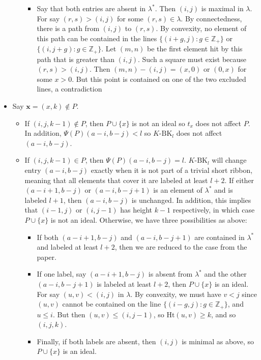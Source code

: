 \documentclass[10pt,letter]{article}
\begin{document}
\begin{itemize}
\begin{itemize}
\begin{itemize}
\item Say that both entries are absent in $\lambda^{\ast}$. Then $(i,j)$ is maximal in $\lambda$. For say $(r,s) > (i,j)$ for some $(r,s) \in \lambda$. By connectedness, there is a path from $(i,j)$ to $(r,s)$. By convexity, no element of this path can be contained in the lines $\lbrace (i+g,j): g \in \mathbb{Z}_+ \rbrace$ or  $\lbrace (i,j+g): g \in \mathbb{Z}_+ \rbrace$. Let $(m,n)$ be the first element hit by this path that is greater than $(i,j)$. Such a square must exist because $(r,s) > (i,j)$. Then $(m,n) - (i,j) = (x,0)$ or $(0,x)$ for some $x > 0$. But this point is contained on one of the two excluded lines, a contradiction
\end{itemize}

\end{itemize}

\item Say $\textbf{x} = (x,k) \not \in P$. 
\begin{itemize}
\item If $(i,j,k-1) \not \in P$, then $P \cup \lbrace x \rbrace$ is not an ideal so $t_x$ does not affect $P$. In addition, $\Psi(P)(a-i,b-j) < l$ so $K$-$\text{BK}_l$ does not affect $(a-i,b-j)$.
\item If $(i,j,k-1) \in P$, then $\Psi(P)(a-i,b-j) = l$. $K$-$\text{BK}_l$ will change entry $(a-i,b-j)$ exactly when it is not part of a trivial short ribbon, meaning that all elements that cover it are labeled at least $l + 2$. If either $(a-i+1,b-j)$ or $(a-i,b-j+1)$ is an element of $\lambda^{\ast}$ and is labeled $l+1$, then $(a-i,b-j)$ is unchanged. In addition, this implies that $(i-1,j)$ or $(i,j-1)$ has height $k-1$ respectively, in which case $P \cup \lbrace x \rbrace$ is not an ideal. Otherwise, we have three possibilities as above:
\begin{itemize}
\item If both $(a-i+1,b-j)$ and $(a-i,b-j+1)$ are contained in $\lambda^{\ast}$ and labeled at least $l+2$, then we are reduced to the case from the paper.
\item If one label, say $(a-i+1,b-j)$ is absent from $\lambda^{\ast}$ and the other $(a-i,b-j+1)$ is labeled at least $l+2$, then $P \cup \lbrace x \rbrace$ is an ideal. For say $(u,v) < (i,j)$ in $\lambda$. By convexity, we must have $v < j$ since $(u,v)$ cannot be contained on the line $\lbrace (i-g,j): g \in \mathbb{Z}_+ \rbrace$, and $u \leq i$. But then $(u,v) \leq (i,j-1)$, so $\text{Ht}(u,v) \geq k$, and so $(i,j,k)$. 
\item Finally, if both labels are absent, then $(i,j)$ is minimal as above, so $P \cup \lbrace x \rbrace$ is an ideal.
\end{itemize} 
\end{itemize}
\end{itemize}
\end{document}
